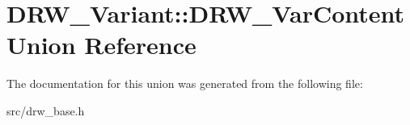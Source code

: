 \hypertarget{union_d_r_w___variant_1_1_d_r_w___var_content}{}\section{D\+R\+W\+\_\+\+Variant\+:\+:D\+R\+W\+\_\+\+Var\+Content Union Reference}
\label{union_d_r_w___variant_1_1_d_r_w___var_content}


The documentation for this union was generated from the following file\+:\begin{DoxyCompactItemize}
\item 
src/drw\+\_\+base.\+h\end{DoxyCompactItemize}
